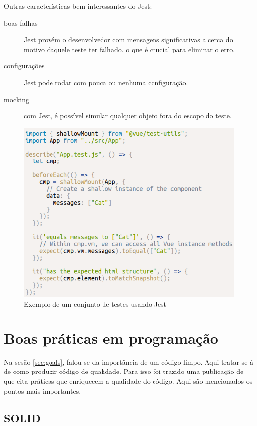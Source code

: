 Outras características bem interessantes do Jest:
\begin{description}
    \item[boas falhas] Jest provém o desenvolvedor com mensagens significativas a cerca do motivo daquele teste
    ter falhado, o que é crucial para eliminar o erro.
    \item[configurações] Jest pode rodar com pouca ou nenhuma configuração.
    \item[mocking] com Jest, é possível simular qualquer objeto fora do escopo do teste.
\end{description}

\begin{figure}[htb]
    \centering
    \includegraphics[width=.55\textwidth]{figuras/jest.png}
    \caption{Exemplo de um conjunto de testes usando Jest}
    \label{fig:jest}
\end{figure}

\section{Boas práticas em programação}
\label{sec:boas-praticas}

Na sesão \ref{sec:goals}, falou-se da importância de um código limpo. Aqui tratar-se-á de como produzir código
de qualidade. Para isso foi trazido uma publicação de \cite{BP} que cita práticas que enriquecem a qualidade do
código. Aqui são mencionados os pontos mais importantes.

\subsection{SOLID}\label{subsec:solid}


